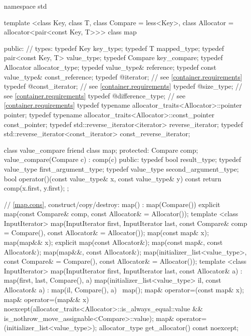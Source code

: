 \begin{codeblock}
namespace std {
  template <class Key, class T, class Compare = less<Key>,
            class Allocator = allocator<pair<const Key, T>>>
  class map {
  public:
    // types:
    typedef Key                                                 key_type;
    typedef T                                                   mapped_type;
    typedef pair<const Key, T>                                  value_type;
    typedef Compare                                             key_compare;
    typedef Allocator                                           allocator_type;
    typedef value_type&                                         reference;
    typedef const value_type&                                   const_reference;
    typedef @\impdefnc@                              iterator;        // see \ref{container.requirements}
    typedef @\impdefnc@                              const_iterator;  // see \ref{container.requirements}
    typedef @\impdefnc@                              size_type;       // see \ref{container.requirements}
    typedef @\impdefnc@                              difference_type; // see \ref{container.requirements}
    typedef typename allocator_traits<Allocator>::pointer       pointer;
    typedef typename allocator_traits<Allocator>::const_pointer const_pointer;
    typedef std::reverse_iterator<iterator>                     reverse_iterator;
    typedef std::reverse_iterator<const_iterator>               const_reverse_iterator;

    class value_compare {
    friend class map;
    protected:
      Compare comp;
      value_compare(Compare c) : comp(c) {}
    public:
      typedef bool result_type;
      typedef value_type first_argument_type;
      typedef value_type second_argument_type;
      bool operator()(const value_type& x, const value_type& y) const {
        return comp(x.first, y.first);
      }
    };

    // \ref{map.cons}, construct/copy/destroy:
    map() : map(Compare()) { }
    explicit map(const Compare& comp, const Allocator& = Allocator());
    template <class InputIterator>
      map(InputIterator first, InputIterator last,
          const Compare& comp = Compare(), const Allocator& = Allocator());
    map(const map& x);
    map(map&& x);
    explicit map(const Allocator&);
    map(const map&, const Allocator&);
    map(map&&, const Allocator&);
    map(initializer_list<value_type>,
      const Compare& = Compare(),
      const Allocator& = Allocator());
    template <class InputIterator>
      map(InputIterator first, InputIterator last, const Allocator& a)
        : map(first, last, Compare(), a) { }
    map(initializer_list<value_type> il, const Allocator& a)
      : map(il, Compare(), a) { }
    ~map();
    map& operator=(const map& x);
    map& operator=(map&& x)
      noexcept(allocator_traits<Allocator>::is_always_equal::value &&
               is_nothrow_move_assignable<Compare>::value);
    map& operator=(initializer_list<value_type>);
    allocator_type get_allocator() const noexcept;

}}
\end{codeblock}
